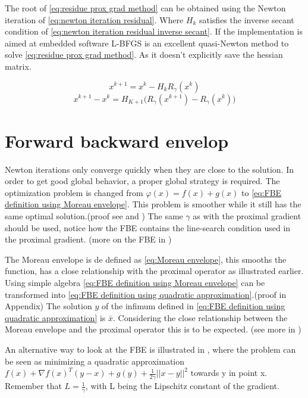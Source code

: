 			The root of \eqref{eq:residue prox grad method} can be obtained using the Newton iteration of \eqref{eq:newton iteration residual}. Where $H_k$ satisfies the inverse secant condition of \eqref{eq:newton iteration residual inverse secant}. If the implementation is aimed at embedded software L-BFGS is an excellent quasi-Newton method to solve \eqref{eq:residue prox grad method}. As it doesn't explicitly save the hessian matrix.
			
			\begin{equation}
			x^{k+1} = x^k -H_kR_{\gamma}(x^k)
			\label{eq:newton iteration residual}
			\end{equation}
			\begin{equation}
			x^{k+1} - x^k = H_{K+1} \Big( R_{\gamma}(x^{k+1})- R_{\gamma}(x^k) \Big)
			\label{eq:newton iteration residual inverse secant}
			\end{equation}
		
	\section{Forward backward envelop}	
		Newton iterations only converge quickly when they are close to the solution. In order to get good global behavior, a proper global strategy is required. The optimization problem is changed from $\varphi(x) = f(x) + g(x)$ to \eqref{eq:FBE definition using Moreau envelope}. This problem is smoother while it still has the same optimal solution.(proof see \cite{LorenzoStella2017} and \cite{Themelis}) The same $\gamma$ as with the proximal gradient should be used, notice how the FBE contains the line-search condition used in the proximal gradient. (more on the FBE in \cite{Themelis})
		
		The Moreau envelope is de defined as \eqref{eq:Moreau envelope}, this smooths the function,  has a close relationship with the proximal operator as illustrated earlier. Using simple algebra \eqref{eq:FBE definition using Moreau envelope} can be transformed into \eqref{eq:FBE definition using quadratic approximation}.(proof in Appendix) The solution $y$ of the infimum defined in \eqref{eq:FBE definition using quadratic approximation} is $\bar{x}$. Considering the close relationship between the Moreau envelope and the proximal operator this is to be expected. (see more in \cite{Themelis}) 
		
		An alternative way to look at the FBE is illustrated in \cite{AjaySathya2017}, where the problem can be seen as minimizing a quadratic approximation  $f(x) +  \nabla f(x)^T(y-x) + g(y) + \frac{1}{2 \gamma} ||x-y||^2  $ towards y in point x.  Remember that $L = \frac{1}{\gamma}$, with L being the Lipschitz constant of the gradient.
		
